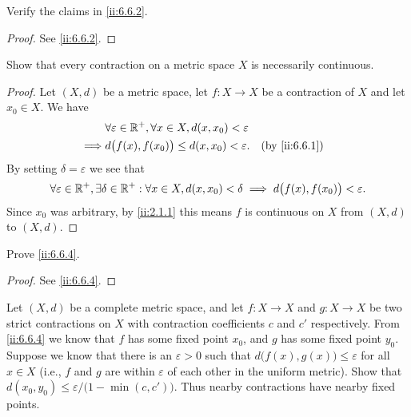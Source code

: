 \begin{ex}\label{ii:ex:6.6.5}
  Verify the claims in \cref{ii:6.6.2}.
\end{ex}

\begin{proof}
  See \cref{ii:6.6.2}.
\end{proof}

\begin{ex}\label{ii:ex:6.6.6}
  Show that every contraction on a metric space \(X\) is necessarily continuous.
\end{ex}

\begin{proof}
  Let \((X, d)\) be a metric space, let \(f : X \to X\) be a contraction of \(X\) and let \(x_0 \in X\).
  We have
  \begin{align*}
             & \forall \varepsilon \in \R^+, \forall x \in X, d(x, x_0) < \varepsilon                    \\
    \implies & d\big(f(x), f(x_0)\big) \leq d(x, x_0) < \varepsilon.                  &  & \by{ii:6.6.1}
  \end{align*}
  By setting \(\delta = \varepsilon\) we see that
  \[
    \forall \varepsilon \in \mathbb{R}^+, \exists \delta \in \mathbb{R}^+ : \forall x \in X, d(x, x_0) < \delta \implies d\big(f(x), f(x_0)\big) < \varepsilon.
  \]
  Since \(x_0\) was arbitrary, by \cref{ii:2.1.1} this means \(f\) is continuous on \(X\) from \((X, d)\) to \((X, d)\).
\end{proof}

\begin{ex}\label{ii:ex:6.6.7}
  Prove \cref{ii:6.6.4}.
\end{ex}

\begin{proof}
  See \cref{ii:6.6.4}.
\end{proof}

\begin{ex}\label{ii:ex:6.6.8}
  Let \((X, d)\) be a complete metric space, and let \(f : X \to X\) and \(g : X \to X\) be two strict contractions on \(X\) with contraction coefficients \(c\) and \(c'\) respectively.
  From \cref{ii:6.6.4} we know that \(f\) has some fixed point \(x_0\), and \(g\) has some fixed point \(y_0\).
  Suppose we know that there is an \(\varepsilon > 0\) such that \(d\big(f(x), g(x)\big) \leq \varepsilon\) for all \(x \in X\)
  (i.e., \(f\) and \(g\) are within \(\varepsilon\) of each other in the uniform metric).
  Show that \(d(x_0, y_0) \leq \varepsilon / \big(1 - \min(c, c')\big)\).
  Thus nearby contractions have nearby fixed points.
\end{ex}

